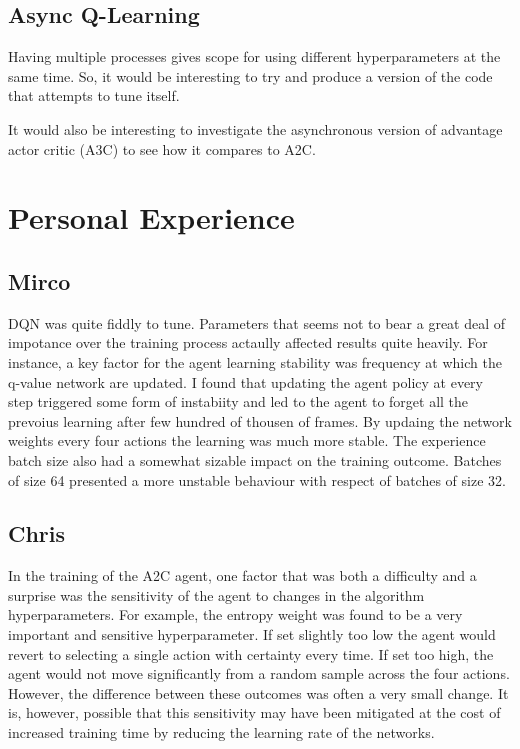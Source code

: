 \documentclass{article}
\begin{document}
\subsection{Async Q-Learning}

Having multiple processes gives scope for using different hyperparameters at the same time. So, it would be interesting to try and produce a version of the code that attempts to tune itself.

It would also be interesting to investigate the asynchronous version of advantage actor critic (A3C) to see how it compares to A2C.

\section{Personal Experience}

\subsection{Mirco}
DQN was quite fiddly to tune. Parameters that seems not to bear a great deal of impotance over the training process actaully affected results quite heavily. For instance, a key factor for the agent learning stability was frequency at which the q-value network are updated. I found that updating the agent policy at every step triggered some form of instabiity and led to the agent to forget all the prevoius learning after few hundred of thousen of frames. By updaing the network weights every four actions the learning was much more stable. The experience batch size also had a somewhat sizable impact on the training outcome. Batches of size 64 presented a more unstable behaviour with  respect of batches of size 32.  

\subsection{Chris}

In the training of the A2C agent, one factor that was both a difficulty and a surprise was the sensitivity of the agent to changes in the algorithm hyperparameters. For example, the entropy weight was found to be a very important and sensitive hyperparameter. If set slightly too low the agent would revert to selecting a single action with certainty every time. If set too high, the agent would not move significantly from a random sample across the four actions. However, the difference between these outcomes was often a very small change. It is, however, possible that this sensitivity may have been mitigated at the cost of increased training time by reducing the learning rate of the networks.
\end{document}
